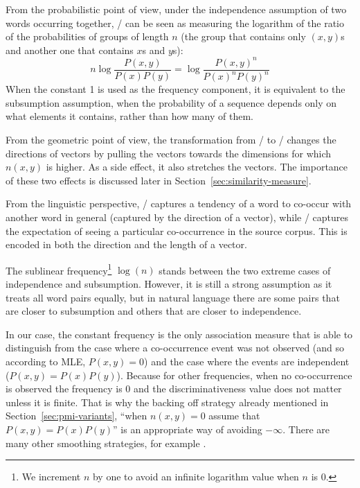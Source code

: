 From the probabilistic point of view, under the independence assumption of two words occurring together, \NPMI/ can be seen as measuring the logarithm of the ratio of the probabilities of groups of length $n$ (the group that contains only $(x,y)$s and another one that contains $x$s and $y$s):
%
\begin{equation*}
  n\log\frac{P(x, y)}{P(x)P(y)} = \log\frac{P(x, y)^{n}}{P(x)^{n}P(y)^{n}}
\end{equation*}
%
When the constant 1 is used as the frequency component, it is equivalent to the subsumption assumption, when the probability of a sequence depends only on what elements it contains, rather than how many of them.

From the geometric point of view, the transformation from \PMI/ to \NPMI/ changes the directions of vectors by pulling the vectors towards the dimensions for which $n(x, y)$ is higher. As a side effect, it also stretches the vectors. The importance of these two effects is discussed later in Section~\ref{sec:similarity-measure}.

From the linguistic perspective, \PMI/ captures a tendency of a word to co-occur with another word in general (captured by the direction of a vector), while \NPMI/ captures the expectation of seeing a particular co-occurrence in the source corpus. This is encoded in both the direction and the length of a vector.

The sublinear frequency\footnote{We increment $n$ by one to avoid an infinite logarithm value when $n$ is 0.} $\log(n)$ stands between the two extreme cases of independence and subsumption. However, it is still a strong assumption as it treats all word pairs equally, but in natural language there are some pairs that are closer to subsumption and others that are closer to independence.

In our case, the constant frequency is the only association measure that is able to distinguish from the case where a co-occurrence event was not observed (and so according to MLE, $P(x, y)= 0$) and the case where the events are independent ($P(x, y) = P(x)P(y)$). Because for other frequencies, when no co-occurrence is observed the frequency is 0 and the discriminativeness value does not matter unless it is finite. That is why the backing off strategy already mentioned in Section~\ref{sec:pmi-variants}, ``when $n(x, y) = 0$ assume that $P(x, y) = P(x)P(y)$'' is an appropriate way of avoiding $-\infty$. There are many other smoothing strategies, for example .

